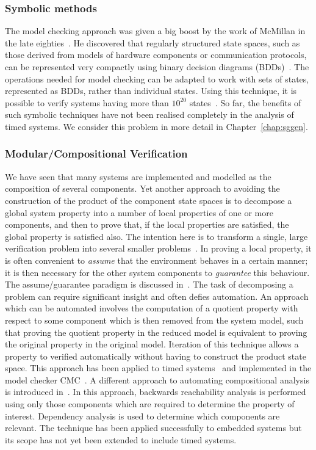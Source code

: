 {\subsubsection{Symbolic methods}
The model checking approach was given a big boost by the work of
McMillan in the late eighties~\cite{mcm:92}. He discovered that
regularly structured state spaces, such as those derived from models
of hardware components or communication protocols, can be represented
very compactly using binary decision diagrams (BDDs)~\cite{bry:86}.
The operations needed for model checking can be adapted to work with
sets of states, represented as BDDs, rather than individual states.
Using this technique, it is possible to verify systems having more
than $10^{20}$ states~\cite{bcm:92}. So far, the benefits of such
symbolic techniques have not been realised completely in the analysis
of timed systems. We consider this problem in more detail in
Chapter~\ref{chap:sggen}.
   
\subsubsection{Modular/Compositional Verification}
We have seen that many systems are implemented and modelled as the
composition of several components. Yet another approach to avoiding
the construction of the product of the component state spaces is to
decompose a global system property into a number of local properties
of one or more components, and then to prove that, if the local
properties are satisfied, the global property is satisfied also. The
intention here is to transform a single, large verification problem
into several smaller problems~\cite{gl:94}.  In proving a local
property, it is often convenient to \emph{assume} that the environment
behaves in a certain manner; it is then necessary for the other system
components to \emph{guarantee} this behaviour. The assume/guarantee
paradigm is discussed in~\cite{hqr:98}.  The task of decomposing a
problem can require significant insight and often defies automation.
An approach which can be automated involves the computation of a
quotient property with respect to some component which is then removed
from the system model, such that proving the quotient property in the
reduced model is equivalent to proving the original property in the
original model.  Iteration of this technique allows a property to
verified automatically without having to construct the product state
space. This approach has been applied to timed systems~\cite{kll:97}
and implemented in the model checker CMC~\cite{ll:98}. A different
approach to automating compositional analysis is introduced
in~\cite{lab:98}. In this approach, backwards reachability analysis is
performed using only those components which are required to determine
the property of interest. Dependency analysis is used to determine
which components are relevant. The technique has been applied
successfully to embedded systems but its scope has not yet been
extended to include timed systems.

}
